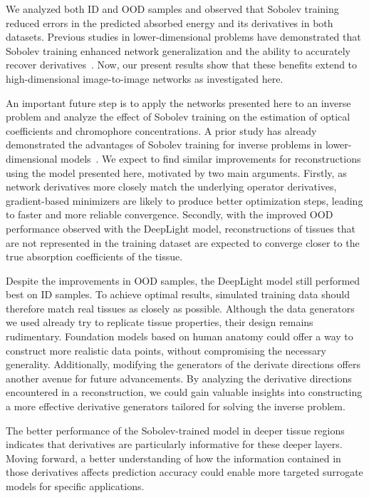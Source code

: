 \documentclass[journal,twoside,web]{ieeecolor}
\begin{document}
We analyzed both ID and OOD samples and observed that Sobolev training reduced errors in the predicted absorbed energy and its derivatives in both datasets. %
Previous studies in lower-dimensional problems have demonstrated that Sobolev training enhanced network generalization and the ability to accurately recover derivatives~\cite{Czarnecki2017,Tsay2021}. %
Now, our present results show that these benefits extend to high-dimensional image-to-image networks as investigated here.\par 

An important future step is to apply the networks presented here to an inverse problem and analyze the effect of Sobolev training on the estimation of optical coefficients and chromophore concentrations. %
A prior study has already demonstrated the advantages of Sobolev training for inverse problems in lower-dimensional models~\cite{Tsay2021}. %
We expect to find similar improvements for reconstructions using the model presented here, motivated by two main arguments. %
Firstly, as network derivatives more closely match the underlying operator derivatives, gradient-based minimizers are likely to produce better optimization steps, leading to faster and more reliable convergence. %
Secondly, with the improved OOD performance observed with the DeepLight model, reconstructions of tissues that are not represented in the training dataset are expected to converge closer to the true absorption coefficients of the tissue. %

Despite the improvements in OOD samples, the DeepLight model still performed best on ID samples. %
To achieve optimal results, simulated training data should therefore match real tissues as closely as possible. %
Although the data generators we used already try to replicate tissue properties, their design remains rudimentary. %
Foundation models based on human anatomy could offer a way to construct more realistic data points, without compromising the necessary generality. %
Additionally, modifying the generators of the derivate directions offers another avenue for future advancements. %
By analyzing the derivative directions encountered in a reconstruction, we could gain valuable insights into constructing a more effective derivative generators tailored for solving the inverse problem.\par

The better performance of the Sobolev-trained model in deeper tissue regions indicates that derivatives are particularly informative for these deeper layers. %
Moving forward, a better understanding of how the information contained in those derivatives affects prediction accuracy could enable more targeted surrogate models for specific applications. %
\end{document}

